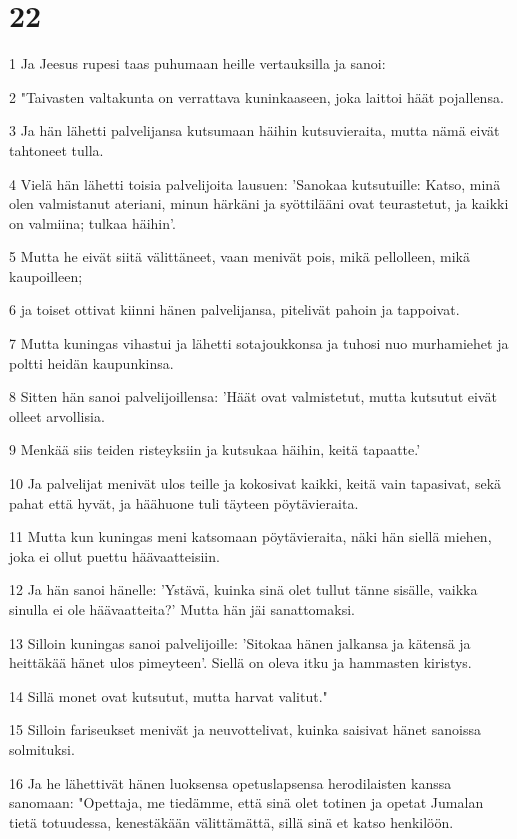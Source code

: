 \chapter{22}

\par 1 Ja Jeesus rupesi taas puhumaan heille vertauksilla ja sanoi:
\par 2 "Taivasten valtakunta on verrattava kuninkaaseen, joka laittoi häät pojallensa.
\par 3 Ja hän lähetti palvelijansa kutsumaan häihin kutsuvieraita, mutta nämä eivät tahtoneet tulla.
\par 4 Vielä hän lähetti toisia palvelijoita lausuen: 'Sanokaa kutsutuille: Katso, minä olen valmistanut ateriani, minun härkäni ja syöttilääni ovat teurastetut, ja kaikki on valmiina; tulkaa häihin'.
\par 5 Mutta he eivät siitä välittäneet, vaan menivät pois, mikä pellolleen, mikä kaupoilleen;
\par 6 ja toiset ottivat kiinni hänen palvelijansa, pitelivät pahoin ja tappoivat.
\par 7 Mutta kuningas vihastui ja lähetti sotajoukkonsa ja tuhosi nuo murhamiehet ja poltti heidän kaupunkinsa.
\par 8 Sitten hän sanoi palvelijoillensa: 'Häät ovat valmistetut, mutta kutsutut eivät olleet arvollisia.
\par 9 Menkää siis teiden risteyksiin ja kutsukaa häihin, keitä tapaatte.'
\par 10 Ja palvelijat menivät ulos teille ja kokosivat kaikki, keitä vain tapasivat, sekä pahat että hyvät, ja häähuone tuli täyteen pöytävieraita.
\par 11 Mutta kun kuningas meni katsomaan pöytävieraita, näki hän siellä miehen, joka ei ollut puettu häävaatteisiin.
\par 12 Ja hän sanoi hänelle: 'Ystävä, kuinka sinä olet tullut tänne sisälle, vaikka sinulla ei ole häävaatteita?' Mutta hän jäi sanattomaksi.
\par 13 Silloin kuningas sanoi palvelijoille: 'Sitokaa hänen jalkansa ja kätensä ja heittäkää hänet ulos pimeyteen'. Siellä on oleva itku ja hammasten kiristys.
\par 14 Sillä monet ovat kutsutut, mutta harvat valitut."
\par 15 Silloin fariseukset menivät ja neuvottelivat, kuinka saisivat hänet sanoissa solmituksi.
\par 16 Ja he lähettivät hänen luoksensa opetuslapsensa herodilaisten kanssa sanomaan: "Opettaja, me tiedämme, että sinä olet totinen ja opetat Jumalan tietä totuudessa, kenestäkään välittämättä, sillä sinä et katso henkilöön.
